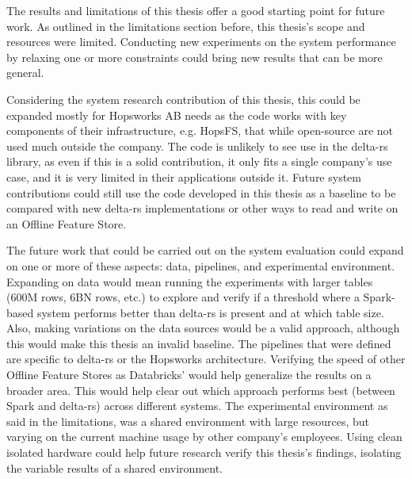 The results and limitations of this thesis offer a good starting point for future work. As outlined in the limitations section before, this thesis's scope and resources were limited. Conducting new experiments on the system performance by relaxing one or more constraints could bring new results that can be more general.

Considering the system research contribution of this thesis, this could be expanded mostly for Hopsworks \gls{AB} needs as the code works with key components of their infrastructure, e.g. \gls{HopsFS}, that while open-source are not used much outside the company. The code is unlikely to see use in the delta-rs library, as even if this is a solid contribution, it only fits a single company's use case, and it is very limited in their applications outside it. Future system contributions could still use the code developed in this thesis as a baseline to be compared with new delta-rs implementations or other ways to read and write on an Offline Feature Store.

The future work that could be carried out on the system evaluation could expand on one or more of these aspects: data, pipelines, and experimental environment. Expanding on data would mean running the experiments with larger tables (600M rows, 6BN rows, etc.) to explore and verify if a threshold where a Spark-based system performs better than delta-rs is present and at which table size. Also, making variations on the data sources would be a valid approach, although this would make this thesis an invalid baseline. The pipelines that were defined are specific to delta-rs or the Hopsworks architecture. Verifying the speed of other Offline Feature Stores as Databricks' would help generalize the results on a broader area. This would help clear out which approach performs best (between Spark and delta-rs) across different systems.
The experimental environment as said in the limitations, was a shared environment with large resources, but varying on the current machine usage by other company's employees. Using clean isolated hardware could help future research verify this thesis's findings, isolating the variable results of a shared environment.